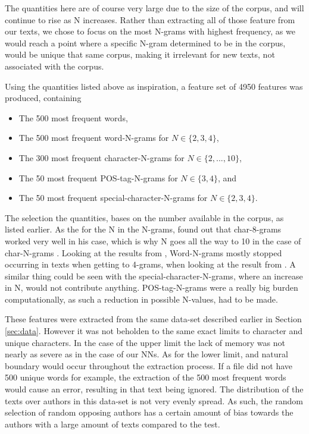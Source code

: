 The quantities here are of course very large due to the size of the corpus,
and will continue to rise as N increases. Rather than extracting all
of those feature from our texts, we chose to focus on the most N-grams
with highest frequency, as we would reach a point where a specific N-gram
determined to be in the corpus, would be unique that same corpus, making it
irrelevant for new texts, not associated with the corpus.

Using the quantities listed above as inspiration, a feature set of 4950
features was produced, containing

\begin{itemize}
    \item The 500 most frequent words,
    \item The 500 most frequent word-N-grams for $N \in \{2,3,4\}$,
    \item The 300 most frequent character-N-grams for $N \in \{2,...,10\}$,
    \item The 50 most frequent \gls{POS}-tag-N-grams for $N \in \{3,4\}$, and
    \item The 50 most frequent special-character-N-grams for $N \in \{2,3,4\}$.
\end{itemize}

The selection the quantities, bases on the number available in the corpus,
as listed earlier. As the for the N in the N-grams, \cite{aalykke2016} found
out that char-8-grams worked very well in his case, which is why N goes all
the way to 10 in the case of char-N-grams . Looking at the results
from \cite{US}, Word-N-grams mostly stopped occurring in texts when getting
to 4-grams, when looking at the result from \cite{US}. A similar thing
could be seen with the special-character-N-grams, where an increase in N,
would not contribute anything. \gls{POS}-tag-N-grams were a really big burden
computationally, as such a reduction in possible N-values, had to be made.

These features were extracted from the same data-set described earlier in
Section \ref{sec:data}. However it was not beholden to the same exact limits to
character and unique characters. In the case of the upper limit the lack of
memory was not nearly as severe as in the case of our \gls{NN}s. As for the lower
limit, and natural boundary would occur throughout the extraction process.
If a file did not have 500 unique words for example, the extraction
of the 500 most frequent words would cause an error, resulting in that
text being ignored.
The distribution of the texts over authors in this data-set is not
very evenly spread. As such, the random selection of random opposing
authors has a certain amount of bias towards the authors with a large
amount of texts compared to the test.

